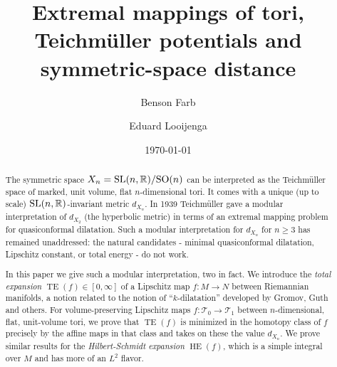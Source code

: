 \documentclass[11pt,letterpaper]{amsart}
\theoremstyle{definition}
\numberwithin{equation}{section}
\theoremstyle{definition}
\newcommand{\Tc}{\mathcal{T}}
\newcommand{\Rb}{\mathbb{R}}
\DeclareMathOperator{\TE}{TE}
\DeclareMathOperator{\HE}{HE}
\begin{document}
\title[Extremal mappings of tori and Teichm\"uller potentials]
{Extremal mappings of tori, Teichm\"uller potentials and symmetric-space distance}

\author{Benson Farb}
\address{Department of Mathematics,
University of Chicago,
Chicago, IL 60637, USA}

\author{Eduard Looijenga}
\address{Mathematisch Instituut,
Universiteit  Utrecht,
3508 TA Utrecht, 
Nederland}

\date{\today}

\maketitle


\begin{abstract}
The symmetric space $X_n={\rm SL}(n,\Rb)/{\rm SO}(n)$ can be interpreted as the Teichm\"uller space of marked, unit volume, flat $n$-dimensional tori. It comes with a unique (up to scale) ${\rm SL}(n,\Rb)$-invariant metric $d_{X_n}$.  In 1939 Teichm\"uller gave a modular interpretation of $d_{X_2}$ (the hyperbolic metric) in terms of an extremal mapping problem for quasiconformal dilatation.  Such a modular interpretation for $d_{X_n}$ for $n\geq 3$ has remained unaddressed: the natural candidates - minimal quasiconformal dilatation, Lipschitz constant, or total energy - do not work.  

In this paper we give such a modular interpretation, two in fact. We introduce the {\em total expansion} $\TE(f)\in [0,\infty]$ of a Lipschitz map $f:M\to N$ between Riemannian manifolds, a notion related to the notion of ``$k$-dilatation'' developed by Gromov, Guth and others.  For volume-preserving Lipschitz maps $f:\Tc_0\to\Tc_1$ between $n$-dimensional, flat, unit-volume tori, we prove that $\TE(f)$ is minimized in the homotopy class of $f$ precisely by the affine maps in that class and takes on these the value $d_{X_n}$.  We prove similar results for the \emph{Hilbert-Schmidt expansion} $\HE(f)$, which is a simple integral over $M$ and has more of an $L^2$ flavor.
\end{abstract}
\end{document}
